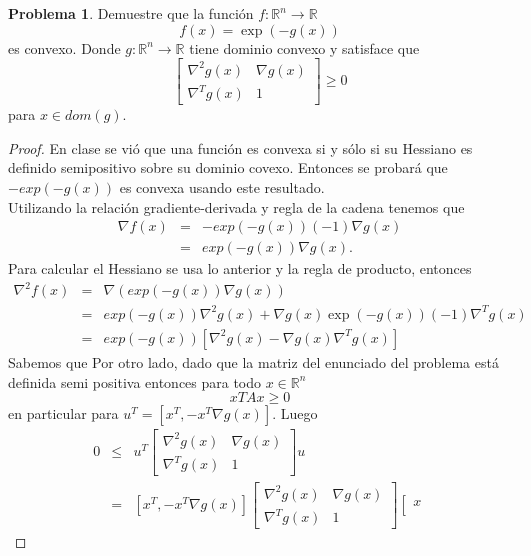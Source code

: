 \documentclass[12pt,letterpaper]{article}
\theoremstyle{definition}
\newtheorem{problm}{Problema}
\begin{document}
\begin{problm}
	Demuestre que la función $ f: \mathbb{R}^n \to \mathbb{R} $
	\[ f(x) = \exp (- g(x)) \]
	es convexo. Donde $ g: \mathbb{R}^n \to \mathbb{R} $ tiene dominio convexo y satisface que
	\[ \left[\begin{matrix}
		\nabla^2 g(x) & \nabla g(x) \\
		\nabla^T g(x) & 1
	\end{matrix}\right]
	\geq 0 \]
	para $ x \in dom(g) $.
	\begin{proof}
		En clase se vió que una función es convexa si y sólo si su Hessiano es definido semipositivo sobre su dominio covexo. Entonces se probará que $ -exp(-g(x)) $ es convexa usando este resultado. \\
		Utilizando la relación gradiente-derivada y regla de la cadena tenemos que
		\begin{eqnarray*}
			\nabla f(x) & = & - exp(-g(x)) (-1) \nabla g(x) \\
						& = & exp(-g(x)) \nabla g(x).
		\end{eqnarray*}
		Para calcular el Hessiano se usa lo anterior y la regla de producto, entonces
		\begin{eqnarray*}
			\nabla^2 f(x) & = & \nabla (exp(-g(x)) \nabla g(x)) \\
						  & = & exp(-g(x)) \nabla^2 g(x) + \nabla g(x) \exp(-g(x)) (-1) \nabla^T g(x) \\
						  & = & exp(-g(x)) \left[ \nabla^2 g(x) - \nabla g(x) \nabla^T g(x) \right]   
		\end{eqnarray*}
		Sabemos que Por otro lado, dado que la matriz del enunciado del problema está definida semi positiva entonces para todo $ x\in\mathbb{R}^n $
		\[ xT A x \geq 0  \]
		en particular para $ u^T = [x^T, -x^T \nabla g(x)] $. Luego
		\begin{eqnarray*}
			0 & \leq & u^T \left[\begin{matrix}
				\nabla^2 g(x) & \nabla g(x) \\
				\nabla^T g(x) & 1
			\end{matrix}\right]
			u \\
			 & = & [x^T, - x^T \nabla g(x)] \left[\begin{matrix}
												 \nabla^2 g(x) & \nabla g(x) \\
												 \nabla^T g(x) & 1
											 \end{matrix}\right]
											 \left[\begin{matrix}
											 	x \\

\end{matrix}
\end{eqnarray*}
\end{proof}
\end{problm}
\end{document}
